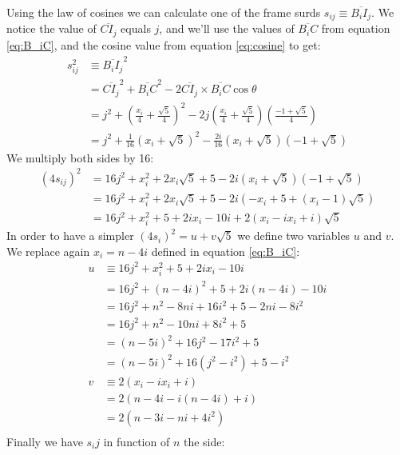 \documentclass[11pt]{article}
\begin{document}
Using the law of cosines we can calculate one of the frame surds $s_{ij} \equiv \overline{B_iI_j}$.
We notice the value of $\overline{CI_j}$ equals $j$, and we'll use the values of $\overline{B_iC}$ from equation \ref{eq:B_iC}, and the cosine value from equation \ref{eq:cosine} to get:
\begin{align}
s_{ij}^2 &\equiv \overline{B_iI_j}^2 \\
 &= \overline{CI_j}^2 + \overline{B_iC}^2 
 - 2\overline{CI_j}\times\overline{B_iC}\cos\theta  \nonumber\\
 &= j^2 + \left(\frac{x_i}{4} + \frac{\sqrt{5}}{4}\right)^2
 - 2j\left(\frac{x_i}{4} + \frac{\sqrt{5}}{4}\right)\left(\frac{-1+\sqrt{5}}{4}\right) \\
 &= j^2 + \frac{1}{16}\left(x_i + \sqrt{5}\right)^2
 - \frac{2i}{16}\left(x_i + \sqrt{5}\right)\left(-1+\sqrt{5}\right)
\end{align}   
We multiply both sides by 16:   
\begin{align}
(4s_{ij})^2 &= 16j^2 + x_i^2 + 2x_i\sqrt{5} + 5
 - 2i\left(x_i + \sqrt{5}\right)\left(-1+\sqrt{5}\right) \\
 &= 16j^2 + x_i^2 + 2x_i\sqrt{5} + 5 - 2i(-x_i + 5 + (x_i-1)\sqrt{5}) \\
 &= 16j^2 + x_i^2 + 5 + 2ix_i - 10i + 2(x_i - ix_i + i)\sqrt{5}
\end{align}
In order to have a simpler $(4s_i)^2 = u+v\sqrt{5}$ we define two variables $u$ and $v$.
We replace again $x_i = n - 4i$ defined in equation \ref{eq:B_iC}:
\begin{align}
u &\equiv 16j^2 + x_i^2 + 5 + 2ix_i - 10i \nonumber\\
 &= 16j^2 + (n - 4i)^2 + 5 + 2i(n - 4i) - 10i \nonumber\\
 &= 16j^2 + n^2 - 8ni + 16i^2 + 5 - 2ni - 8i^2 \nonumber\\
 &= 16j^2 + n^2 - 10ni + 8i^2 + 5 \nonumber\\
 &= (n - 5i)^2 + 16j^2 - 17i^2 + 5 \nonumber\\
 &= (n - 5i)^2 + 16(j^2-i^2) + 5 - i^2 \\
v &\equiv 2(x_i - ix_i + i) \nonumber\\
 &= 2(n-4i - i(n-4i) + i) \nonumber\\
 &= 2(n-3i - ni + 4i^2) \nonumber\\
\end{align}
Finally we have $s_ij$ in function of $n$ the side:
\end{document}
